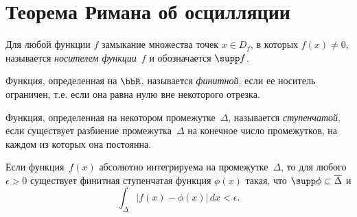 \section{Теорема Римана об осцилляции}
\begin{defn}
Для любой функции $f$ замыкание множества точек $x \in D_{f}$, в которых $f(x) \neq 0$, называется \textit{носителем функции~$f$} и обозначается $\supp f$.
\end{defn}
\begin{defn}
Функция, определенная на $\bbR$, называется \textit{финитной}, если ее носитель ограничен, т.е. если она равна нулю вне некоторого отрезка.
\end{defn}
\begin{defn}
Функция, определенная на некотором промежутке~$\Delta$, называется \textit{ступенчатой}, если существует разбиение промежутка~$\Delta$ на конечное число промежутков, на каждом из которых она постоянна.
\end{defn}
\begin{thm} \label{ch17thm1}
Если функция~$f(x)$ абсолютно интегрируема на промежутке~$\Delta$, то для любого $\epsilon > 0$ существует финитная ступенчатая функция $\phi(x)$ такая, что $\supp\phi \subset \overline{\Delta}$ и
\begin{equation} \label{ch17eq7}
\int_{\Delta} |f(x) - \phi(x)|\,dx < \epsilon.
\end{equation}
\end{thm}
